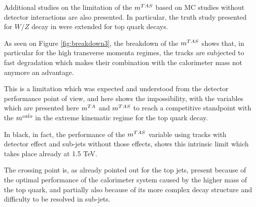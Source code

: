 Additional studies on the limitation of the $m^{TAS}$ based on MC studies without detector interactions are also presented. In particular, the truth study presented for $W/Z$ decay in were extended for top quark decays.

As seen on Figure \ref{fig:breakdown3}, the breakdown of the $m^{TAS}$ shows that, in particular for the high transverse momenta regimes, the tracks are subjected to fast degradation which makes their combination with the calorimeter mass not anymore an advantage. 

This is a limitation which was expected and understood from the detector performance point of view, and here shows the impossibility, with the variables which are presented here $m^{TA}$ and $m^{TAS}$ to reach a competitive standpoint with the $m^{calo}$ in the extreme kinematic regime for the top quark decay.

In black, in fact, the performance of the $m^{TAS}$ variable using tracks with detector effect and sub-jets without those effects, shows this intrinsic limit which takes place already at 1.5 TeV.

The crossing point is, as already pointed out for the top jets, present because of the optimal performance of the calorimeter system caused by the higher mass of the top quark, and partially also because of its more complex decay structure and difficulty to be resolved in sub-jets.




% 


